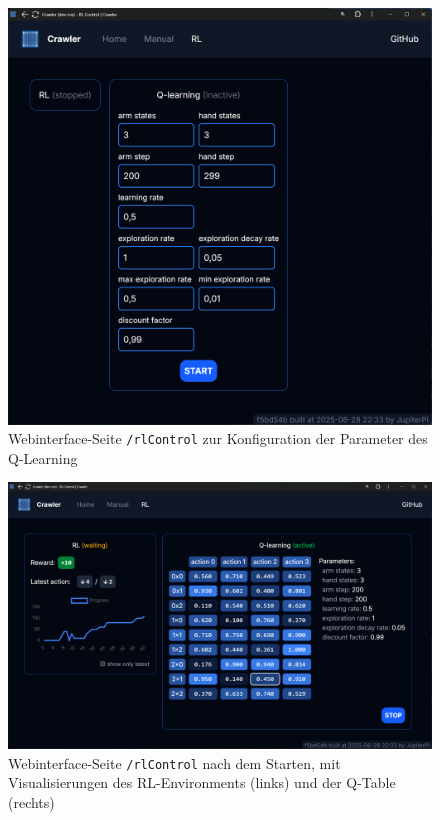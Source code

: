 \begin{figure}[H]
	\includegraphics[scale=0.22]{photos/webinterface_rlControl_1.png}
	\caption{Webinterface-Seite \texttt{/rlControl} zur Konfiguration der Parameter des Q-Learning}
\end{figure}

\begin{figure}[H]
	\includegraphics[width=\textwidth]{photos/webinterface_rlControl_2.png}
	\caption{Webinterface-Seite \texttt{/rlControl} nach dem Starten, mit Visualisierungen des RL-Environments (links) und der Q-Table (rechts)}
\end{figure}

